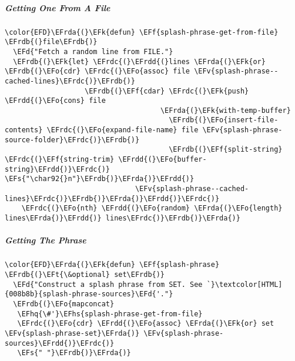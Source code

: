 \documentclass{article}
\newcommand{\EFs}[1]{\textcolor{EFs}{#1}} %
\newcommand{\EFd}[1]{\textcolor{EFd}{#1}} %
\newcommand{\EFk}[1]{\textcolor{EFk}{#1}} %
\newcommand{\EFf}[1]{\textcolor{EFf}{#1}} %
\newcommand{\EFv}[1]{\textcolor{EFv}{#1}} %
\newcommand{\EFt}[1]{\textcolor{EFt}{#1}} %
\newcommand{\EFo}[1]{\textcolor{EFo}{#1}} %
\newcommand{\EFhq}[1]{#1} %
\newcommand{\EFhs}[1]{\textcolor{EFhs}{#1}} %
\newcommand{\EFrda}[1]{\textcolor{EFrda}{#1}} %
\newcommand{\EFrdb}[1]{\textcolor{EFrdb}{#1}} %
\newcommand{\EFrdc}[1]{\textcolor{EFrdc}{#1}} %
\newcommand{\EFrdd}[1]{\textcolor{EFrdd}{#1}} %
\begin{document}
\subparagraph{Getting One From A File}
\label{sec:orga907096}
\begin{Code}
\begin{Verbatim}
\color{EFD}\EFrda{(}\EFk{defun} \EFf{splash-phrase-get-from-file} \EFrdb{(}file\EFrdb{)}
  \EFd{"Fetch a random line from FILE."}
  \EFrdb{(}\EFk{let} \EFrdc{(}\EFrdd{(}lines \EFrda{(}\EFk{or} \EFrdb{(}\EFo{cdr} \EFrdc{(}\EFo{assoc} file \EFv{splash-phrase--cached-lines}\EFrdc{)}\EFrdb{)}
                   \EFrdb{(}\EFf{cdar} \EFrdc{(}\EFk{push} \EFrdd{(}\EFo{cons} file
                                     \EFrda{(}\EFk{with-temp-buffer}
                                       \EFrdb{(}\EFo{insert-file-contents} \EFrdc{(}\EFo{expand-file-name} file \EFv{splash-phrase-source-folder}\EFrdc{)}\EFrdb{)}
                                       \EFrdb{(}\EFf{split-string} \EFrdc{(}\EFf{string-trim} \EFrdd{(}\EFo{buffer-string}\EFrdd{)}\EFrdc{)} \EFs{"\char92{}n"}\EFrdb{)}\EFrda{)}\EFrdd{)}
                               \EFv{splash-phrase--cached-lines}\EFrdc{)}\EFrdb{)}\EFrda{)}\EFrdd{)}\EFrdc{)}
    \EFrdc{(}\EFo{nth} \EFrdd{(}\EFo{random} \EFrda{(}\EFo{length} lines\EFrda{)}\EFrdd{)} lines\EFrdc{)}\EFrdb{)}\EFrda{)}

\end{Verbatim}
\end{Code}

\subparagraph{Getting The Phrase}
\label{sec:orgac6eb11}
\begin{Code}
\begin{Verbatim}
\color{EFD}\EFrda{(}\EFk{defun} \EFf{splash-phrase} \EFrdb{(}\EFt{\&optional} set\EFrdb{)}
  \EFd{"Construct a splash phrase from SET. See `}\textcolor[HTML]{008b8b}{splash-phrase-sources}\EFd{'."}
  \EFrdb{(}\EFo{mapconcat}
   \EFhq{\#'}\EFhs{splash-phrase-get-from-file}
   \EFrdc{(}\EFo{cdr} \EFrdd{(}\EFo{assoc} \EFrda{(}\EFk{or} set \EFv{splash-phrase-set}\EFrda{)} \EFv{splash-phrase-sources}\EFrdd{)}\EFrdc{)}
   \EFs{" "}\EFrdb{)}\EFrda{)}
\end{Verbatim}
\end{Code}
\end{document}
